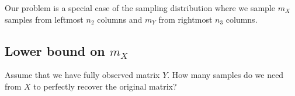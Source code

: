 \documentclass{article} %
\theoremstyle{definition}
\begin{document}
Our problem is a special case of the sampling distribution where we sample $m_X$ samples from leftmost $n_2$ columns and $m_Y$ from rightmost $n_3$ columns.

\subsection{Lower bound on $m_X$}
Assume that we have fully observed matrix $Y$. How many samples do we need from $X$ to perfectly recover the original matrix?




\end{document}
